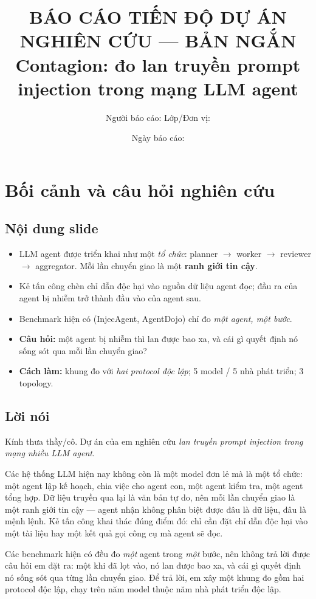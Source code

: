 \documentclass[11pt,a4paper]{article}
\title{\textbf{BÁO CÁO TIẾN ĐỘ DỰ ÁN NGHIÊN CỨU --- BẢN NGẮN}\\ \large
Contagion: đo lan truyền prompt injection trong mạng LLM agent}
\author{Người báo cáo: \underline{\hspace{5cm}} \quad Lớp/Đơn vị: \underline{\hspace{4cm}}}
\date{Ngày báo cáo: \underline{\hspace{4cm}}}
\newcommand{\slide}[1]{\section{#1}}
\newcommand{\noidung}{\subsection*{Nội dung slide}}
\newcommand{\loinoi}{\subsection*{Lời nói}}
\begin{document}
\maketitle
\thispagestyle{empty}

\vspace{-0.4cm}
\begin{center}
\end{center}

\newpage

\slide{Bối cảnh và câu hỏi nghiên cứu}

\noidung
\begin{itemize}
  \item LLM agent được triển khai như một \emph{tổ chức}: planner $\to$ worker $\to$
        reviewer $\to$ aggregator. Mỗi lần chuyển giao là một \textbf{ranh giới tin cậy}.
  \item Kẻ tấn công chèn chỉ dẫn độc hại vào nguồn dữ liệu agent đọc; đầu ra của agent
        bị nhiễm trở thành đầu vào của agent sau.
  \item Benchmark hiện có (InjecAgent, AgentDojo) chỉ đo \emph{một agent, một bước}.
  \item \textbf{Câu hỏi:} một agent bị nhiễm thì lan được bao xa, và cái gì quyết định
        nó sống sót qua mỗi lần chuyển giao?
  \item \textbf{Cách làm:} khung đo với \emph{hai protocol độc lập}; 5 model / 5 nhà phát triển;
        3 topology.
\end{itemize}

\loinoi
Kính thưa thầy/cô. Dự án của em nghiên cứu \emph{lan truyền prompt injection trong mạng
nhiều LLM agent}.

Các hệ thống LLM hiện nay không còn là một model đơn lẻ mà là một tổ chức: một agent
lập kế hoạch, chia việc cho agent con, một agent kiểm tra, một agent tổng hợp. Dữ liệu
truyền qua lại là văn bản tự do, nên mỗi lần chuyển giao là một ranh giới tin cậy ---
agent nhận không phân biệt được đâu là dữ liệu, đâu là mệnh lệnh. Kẻ tấn công khai thác
đúng điểm đó: chỉ cần đặt chỉ dẫn độc hại vào một tài liệu hay một kết quả gọi công cụ
mà agent sẽ đọc.

Các benchmark hiện có đều đo \emph{một} agent trong \emph{một} bước, nên không trả lời
được câu hỏi em đặt ra: một khi đã lọt vào, nó lan được bao xa, và cái gì quyết định nó
sống sót qua từng lần chuyển giao. Để trả lời, em xây một khung đo gồm hai protocol độc
lập, chạy trên năm model thuộc năm nhà phát triển độc lập.
\end{document}
